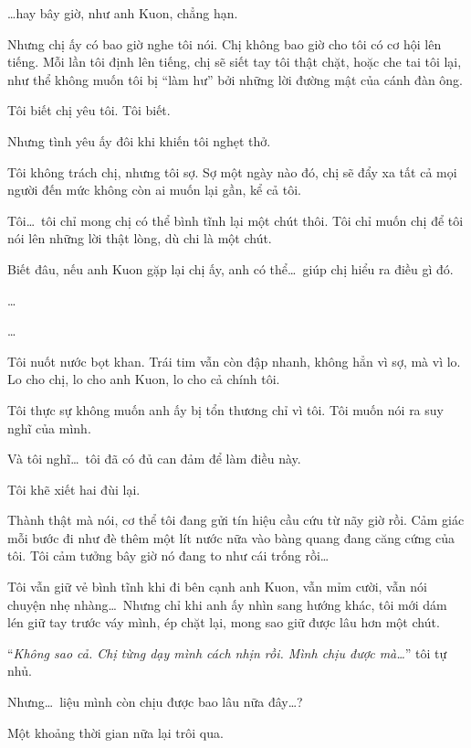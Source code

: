 \documentclass[../main.tex]{subfiles}
\begin{document}
\dots hay bây giờ, như anh Kuon, chẳng hạn.

Nhưng chị ấy có bao giờ nghe tôi nói. Chị không bao giờ cho tôi có cơ hội lên tiếng. Mỗi lần tôi định lên tiếng, chị sẽ siết tay tôi thật chặt, hoặc che tai tôi lại, như thể không muốn tôi bị ``làm hư'' bởi những lời đường mật của cánh đàn ông.

Tôi biết chị yêu tôi. Tôi biết.

Nhưng tình yêu ấy đôi khi khiến tôi nghẹt thở.

Tôi không trách chị, nhưng tôi sợ. Sợ một ngày nào đó, chị sẽ đẩy xa tất cả mọi người đến mức không còn ai muốn lại gần, kể cả tôi.

Tôi\dots\ tôi chỉ mong chị có thể bình tĩnh lại một chút thôi. Tôi chỉ muốn chị để tôi nói lên những lời thật lòng, dù chi là một chút.

Biết đâu, nếu anh Kuon gặp lại chị ấy, anh có thể\dots\ giúp chị hiểu ra điều gì đó.

\dots

\dots

Tôi nuốt nước bọt khan. Trái tim vẫn còn đập nhanh, không hẳn vì sợ, mà vì lo. Lo cho chị, lo cho anh Kuon, lo cho cả chính tôi.

Tôi thực sự không muốn anh ấy bị tổn thương chỉ vì tôi. Tôi muốn nói ra suy nghĩ của mình.

Và tôi nghĩ\dots\ tôi đã có đủ can đảm để làm điều này.

\il

Tôi khẽ xiết hai đùi lại.

Thành thật mà nói, cơ thể tôi đang gửi tín hiệu cầu cứu từ nãy giờ rồi. Cảm giác mỗi bước đi như đè thêm một lít nước nữa vào bàng quang đang căng cứng của tôi. Tôi cảm tưởng bây giờ nó đang to như cái trống rồi\dots

Tôi vẫn giữ vẻ bình tĩnh khi đi bên cạnh anh Kuon, vẫn mỉm cười, vẫn nói chuyện nhẹ nhàng\dots\ Nhưng chỉ khi anh ấy nhìn sang hướng khác, tôi mới dám lén giữ tay trước váy mình, ép chặt lại, mong sao giữ được lâu hơn một chút.

``\textit{Không sao cả. Chị từng dạy mình cách nhịn rồi. Mình chịu được mà\dots}'' tôi tự nhủ.

Nhưng\dots\ liệu mình còn chịu được bao lâu nữa đây\dots?

\il

\ct


Một khoảng thời gian nữa lại trôi qua.
\end{document}
